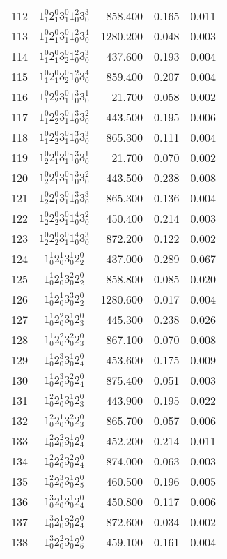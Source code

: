 \begin{table}
\begin{tabular}{rcrrr}
112&$1_1^0 2_1^0 3_1^0 1_0^2 3_0^3$& 858.400& 0.165& 0.011\\
113&$1_1^0 2_1^0 3_1^0 1_0^2 3_0^4$& 1280.200& 0.048& 0.003\\
114&$1_1^0 2_1^0 3_2^0 1_0^2 3_0^3$& 437.600& 0.193& 0.004\\
115&$1_1^0 2_1^0 3_2^0 1_0^2 3_0^4$& 859.400& 0.207& 0.004\\
116&$1_1^0 2_2^0 3_1^0 1_0^3 3_0^1$& 21.700& 0.058& 0.002\\
117&$1_1^0 2_2^0 3_1^0 1_0^3 3_0^2$& 443.500& 0.195& 0.006\\
118&$1_1^0 2_2^0 3_1^0 1_0^3 3_0^3$& 865.300& 0.111& 0.004\\
119&$1_2^0 2_1^0 3_1^0 1_0^3 3_0^1$& 21.700& 0.070& 0.002\\
120&$1_2^0 2_1^0 3_1^0 1_0^3 3_0^2$& 443.500& 0.238& 0.008\\
121&$1_2^0 2_1^0 3_1^0 1_0^3 3_0^3$& 865.300& 0.136& 0.004\\
122&$1_2^0 2_2^0 3_1^0 1_0^4 3_0^2$& 450.400& 0.214& 0.003\\
123&$1_2^0 2_2^0 3_1^0 1_0^4 3_0^3$& 872.200& 0.122& 0.002\\
124&$1_0^1 2_0^1 3_0^1 2_2^0$& 437.000& 0.289& 0.067\\
125&$1_0^1 2_0^1 3_0^2 2_2^0$& 858.800& 0.085& 0.020\\
126&$1_0^1 2_0^1 3_0^3 2_2^0$& 1280.600& 0.017& 0.004\\
127&$1_0^1 2_0^2 3_0^1 2_3^0$& 445.300& 0.238& 0.026\\
128&$1_0^1 2_0^2 3_0^2 2_3^0$& 867.100& 0.070& 0.008\\
129&$1_0^1 2_0^3 3_0^1 2_4^0$& 453.600& 0.175& 0.009\\
130&$1_0^1 2_0^3 3_0^2 2_4^0$& 875.400& 0.051& 0.003\\
131&$1_0^2 2_0^1 3_0^1 2_3^0$& 443.900& 0.195& 0.022\\
132&$1_0^2 2_0^1 3_0^2 2_3^0$& 865.700& 0.057& 0.006\\
133&$1_0^2 2_0^2 3_0^1 2_4^0$& 452.200& 0.214& 0.011\\
134&$1_0^2 2_0^2 3_0^2 2_4^0$& 874.000& 0.063& 0.003\\
135&$1_0^2 2_0^3 3_0^1 2_5^0$& 460.500& 0.196& 0.005\\
136&$1_0^3 2_0^1 3_0^1 2_4^0$& 450.800& 0.117& 0.006\\
137&$1_0^3 2_0^1 3_0^2 2_4^0$& 872.600& 0.034& 0.002\\
138&$1_0^3 2_0^2 3_0^1 2_5^0$& 459.100& 0.161& 0.004\\

\end{tabular}
\end{table}
